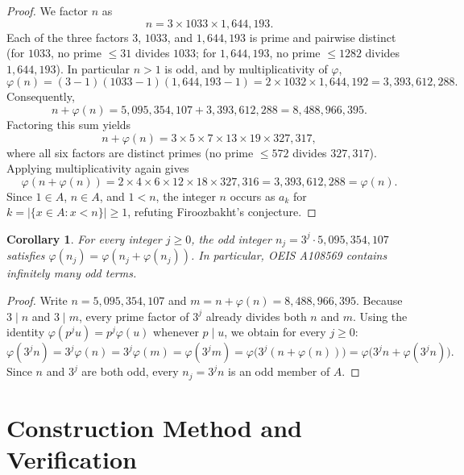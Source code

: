 \documentclass[11pt]{article}
\newtheorem{corollary}{Corollary}
\begin{document}
\begin{proof}
We factor $n$ as
\[
  n = 3 \times 1033 \times 1{,}644{,}193.
\]
Each of the three factors $3$, $1033$, and $1{,}644{,}193$ is prime and pairwise distinct (for $1033$, no prime $\le 31$ divides $1033$; for $1{,}644{,}193$, no prime $\le 1282$ divides $1{,}644{,}193$). In particular $n > 1$ is odd, and by multiplicativity of $\varphi$,
\[
  \varphi(n) = (3 - 1)(1033 - 1)(1{,}644{,}193 - 1) = 2 \times 1032 \times 1{,}644{,}192 = 3{,}393{,}612{,}288.
\]
Consequently,
\[
  n + \varphi(n) = 5{,}095{,}354{,}107 + 3{,}393{,}612{,}288 = 8{,}488{,}966{,}395.
\]
Factoring this sum yields
\[
  n + \varphi(n) = 3 \times 5 \times 7 \times 13 \times 19 \times 327{,}317,
\]
where all six factors are distinct primes (no prime $\le 572$ divides $327{,}317$). Applying multiplicativity again gives
\[
  \varphi(n + \varphi(n)) = 2 \times 4 \times 6 \times 12 \times 18 \times 327{,}316 = 3{,}393{,}612{,}288 = \varphi(n).
\]
Since $1 \in A$, $n \in A$, and $1 < n$, the integer $n$ occurs as $a_k$ for $k = |\{x \in A : x < n\}| \ge 1$, refuting Firoozbakht's conjecture.
\end{proof}

\begin{corollary}\label{cor:family}
For every integer $j \ge 0$, the odd integer $n_j = 3^j \cdot 5{,}095{,}354{,}107$ satisfies $\varphi(n_j) = \varphi(n_j + \varphi(n_j))$. In particular, OEIS A108569 contains infinitely many odd terms.
\end{corollary}

\begin{proof}
Write $n = 5{,}095{,}354{,}107$ and $m = n + \varphi(n) = 8{,}488{,}966{,}395$. Because $3 \mid n$ and $3 \mid m$, every prime factor of $3^j$ already divides both $n$ and $m$. Using the identity $\varphi(p^j u) = p^j \varphi(u)$ whenever $p \mid u$, we obtain for every $j \ge 0$:
\[
  \varphi(3^j n) = 3^j \varphi(n) = 3^j \varphi(m) = \varphi(3^j m) = \varphi\bigl(3^j(n + \varphi(n))\bigr) = \varphi\bigl(3^j n + \varphi(3^j n)\bigr).
\]
Since $n$ and $3^j$ are both odd, every $n_j = 3^j n$ is an odd member of $A$.
\end{proof}

\section{Construction Method and Verification}
\end{document}
